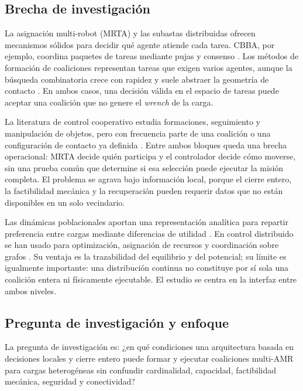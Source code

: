 \subsection{Brecha de investigación}

La asignación multi-robot (MRTA) y las subastas distribuidas ofrecen mecanismos sólidos para decidir qué agente atiende cada tarea. CBBA, por ejemplo, coordina paquetes de tareas mediante pujas y consenso \citep{choi2009consensus}. Los métodos de formación de coaliciones representan tareas que exigen varios agentes, aunque la búsqueda combinatoria crece con rapidez y suele abstraer la geometría de contacto \citep{sandholm1999coalition,rahwan2015coalition}. En ambos casos, una decisión válida en el espacio de tareas puede aceptar una coalición que no genere el \emph{wrench} de la carga.

La literatura de control cooperativo estudia formaciones, seguimiento y manipulación de objetos, pero con frecuencia parte de una coalición o una configuración de contacto ya definida \citep{tuci2018cooperative}. Entre ambos bloques queda una brecha operacional: MRTA decide quién participa y el controlador decide cómo moverse, sin una prueba común que determine si esa selección puede ejecutar la misión completa. El problema se agrava bajo información local, porque el cierre entero, la factibilidad mecánica y la recuperación pueden requerir datos que no están disponibles en un solo vecindario.

Las dinámicas poblacionales aportan una representación analítica para repartir preferencia entre cargas mediante diferencias de utilidad \citep{sandholm2010population,quijano2017population}. En control distribuido se han usado para optimización, asignación de recursos y coordinación sobre grafos \citep{barreiro2017distributed,martinezpiazuelo2022tcss}. Su ventaja es la trazabilidad del equilibrio y del potencial; su límite es igualmente importante: una distribución continua no constituye por sí sola una coalición entera ni físicamente ejecutable. El estudio se centra en la interfaz entre ambos niveles.






\subsection{Pregunta de investigación y enfoque}

La pregunta de investigación es: ¿en qué condiciones una arquitectura basada en decisiones locales y cierre entero puede formar y ejecutar coaliciones multi-AMR para cargas heterogéneas sin confundir cardinalidad, capacidad, factibilidad mecánica, seguridad y conectividad?

